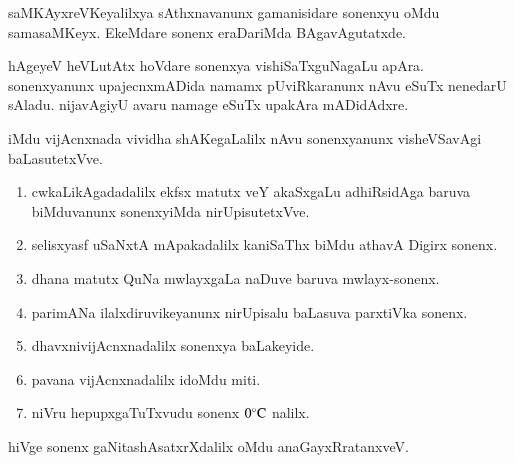 saMKAyxreVKeyalilxya sAthxnavanunx gamanisidare sonenxyu oMdu samasaMKeyx. EkeMdare sonenx eraDariMda BAgavAgutatxde.

hAgeyeV heVLutAtx hoVdare sonenxya vishiSaTxguNagaLu apAra. sonenxyanunx upajecnxmADida namamx pUviRkaranunx nAvu eSuTx nenedarU sAladu. nijavAgiyU avaru namage eSuTx upakAra mADidAdxre.

iMdu vijAcnxnada vividha shAKegaLalilx nAvu sonenxyanunx visheVSavAgi baLasutetxVve.

\begin{enumerate}[{\rm 1.}]
\item cwkaLikAgadadalilx ekfsx matutx veY akaSxgaLu adhiRsidAga baruva biMduvanunx sonenxyiMda nirUpisutetxVve.
\item selisxyasf uSaNxtA mApakadalilx kaniSaThx biMdu athavA Digirx sonenx.
\item dhana matutx QuNa mwlayxgaLa naDuve baruva mwlayx-sonenx.
\item parimANa ilalxdiruvikeyanunx nirUpisalu baLasuva parxtiVka sonenx.
\item dhavxnivijAcnxnadalilx sonenxya baLakeyide.
\item pavana vijAcnxnadalilx idoMdu miti.
\item niVru hepupxgaTuTxvudu sonenx $0^{\circ}{\rm C}$ nalilx.
\end{enumerate}
hiVge sonenx gaNitashAsatxrXdalilx oMdu anaGayxRratanxveV.
